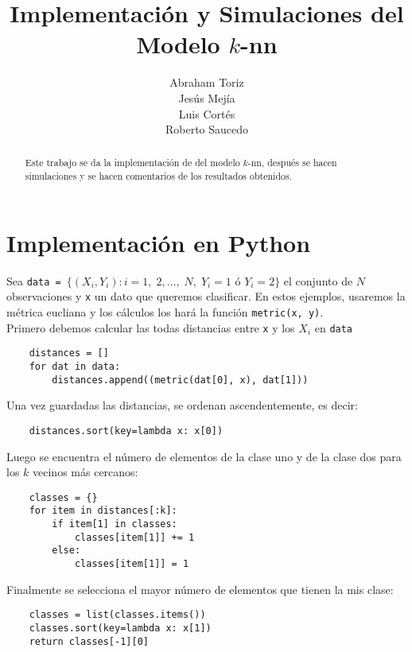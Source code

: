 \documentclass[11pt,letterpaper,reqno]{article}
\title{Implementación y Simulaciones del Modelo $k$-nn}
\author{Abraham Toriz\\ Jesús Mejía\\ Luis Cortés\\ Roberto Saucedo}
\begin{document}
\maketitle
\begin{abstract}
Este trabajo se da la implementación  de del modelo $k$-nn, después se hacen simulaciones y se hacen comentarios de los resultados obtenidos.
\end{abstract}

\section{Implementación en Python}
Sea \verb|data = |$\{(X_i, Y_i): i=1,\;2,\ldots,\;N,\; Y_i=1 \text{ ó } Y_i=2\}$ el conjunto de $N$ observaciones y \verb|x| un dato que queremos clasificar. En estos ejemplos, usaremos la métrica eucliana y los cálculos los hará la función \verb|metric(x, y)|.\\

Primero debemos calcular las todas distancias entre \verb|x| y los $X_i$ en \verb|data|
\begin{verbatim}
    distances = []
    for dat in data:
        distances.append((metric(dat[0], x), dat[1]))
\end{verbatim}

Una vez guardadas las distancias, se ordenan ascendentemente, es decir:
\begin{verbatim}
    distances.sort(key=lambda x: x[0])
\end{verbatim}
Luego se encuentra el número de elementos de la clase uno y de la clase dos para los $k$ vecinos más cercanos:
\begin{verbatim}
    classes = {}
    for item in distances[:k]:
        if item[1] in classes:
            classes[item[1]] += 1
        else:
            classes[item[1]] = 1
\end{verbatim}
Finalmente se selecciona el mayor número de elementos que tienen la mis clase:
\begin{verbatim}
    classes = list(classes.items())
    classes.sort(key=lambda x: x[1])
    return classes[-1][0]
\end{verbatim}
\end{document}
